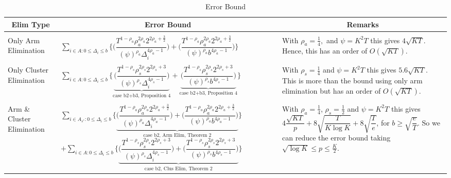 \begin{remark}
\begin{table}
\begin{center}
\begin{tabular}{p{1.4cm}p{10.2cm}p{3.5cm}}
\end{tabular}
\end{center}
\end{table}

\begin{table}
\caption{Error Bound}
\label{App:E:table:3}
\begin{center}
\begin{tabular}{p{1.4cm}p{10.2cm}p{3.5cm}}
\multicolumn{1}{c}{\bf Elim Type} &\multicolumn{1}{c}{\bf Error Bound} &\multicolumn{1}{c}{\bf Remarks} \\
\hline \\
Only Arm Elimination	&$\sum_{i\in A:0\leq\Delta_{i}\leq b}\bigg\lbrace\bigg(\dfrac{T^{1-\rho_{a}}\rho_{a}^{2\rho_{a}}2^{2\rho_{a}+\frac{3}{2}}}{(\psi)^{\rho_{a}}\Delta_{i}^{4\rho_{a} -1}} \bigg) + \bigg( \dfrac{T^{1-\rho_{a}}\rho_{a}^{2\rho_{a}}2^{2\rho_{a}+\frac{3}{2}}}{(\psi)^{\rho_{a}}b^{4\rho_{a} -1}} \bigg)\bigg\rbrace$ & With $\rho_{a}=\frac{1}{4},$ and $\psi=K^{2}T$ this gives $4\sqrt{KT}$. Hence, this has an order of $O(\sqrt{KT})$.\\
\hline\\
Only Cluster Elimination	&$\sum_{i\in A:0\leq\Delta_{i}\leq b}\bigg\lbrace\underbrace{\bigg(\dfrac{T^{1-\rho_{s}}\rho_{s}^{2\rho_{s}}2^{2\rho_{s}+3}}{(\psi)^{\rho_{s}}\Delta_{i}^{4\rho_{s} -1}} \bigg)}_{\text{case b2+b3, Proposition 4}} +\underbrace{\bigg(\dfrac{T^{1-\rho_{s}}\rho_{s}^{2\rho_{s}}2^{2\rho_{s}+3}}{(\psi)^{\rho_{s}}b^{4\rho_{s} -1}} \bigg)}_{\text{case b2+b3, Proposition 4}}\bigg\rbrace$ & With $\rho_{s}=\frac{1}{4}$ and $\psi=K^{2}T$ this gives $5.6\sqrt{KT}$. This is more than the bound using only arm elimination but has an order of $O(\sqrt{KT})$.\\
\hline\\
Arm \& Cluster Elimination 	&$\sum_{i\in A_{s^{*}}:0\leq\Delta_{i}\leq b}\bigg\lbrace \underbrace{\bigg(\dfrac{T^{1-\rho_{a}}\rho_{a}^{2\rho_{a}}2^{2\rho_{a}+\frac{3}{2}}}{(\psi)^{\rho_{a}}\Delta_{i}^{4\rho_{a}-1}} \bigg)+\bigg(\dfrac{T^{1-\rho_{a}}\rho_{a}^{2\rho_{a}}2^{2\rho_{a}+\frac{3}{2}}}{(\psi)^{\rho_{a}}b^{4\rho_{a} -1}} \bigg)}_{\text{case b2, Arm Elim, Theorem 2}}\bigg\rbrace $ $+ \sum_{i\in A:0\leq\Delta_{i}\leq b}\bigg\lbrace\underbrace{\bigg(\dfrac{T^{1-\rho_{s}}\rho_{s}^{2\rho_{s}}2^{2\rho_{s}+3}}{(\psi)^{\rho_{s}}\Delta_{i}^{4\rho_{s}-1}} \bigg)+\bigg(\dfrac{T^{1-\rho_{s}}\rho_{s}^{2\rho_{s}}2^{2\rho_{s}+3}}{(\psi)^{\rho_{s}}b^{4\rho_{s} -1}} \bigg)}_{\text{case b2, Clus Elim, Theorem 2}} \bigg\rbrace$ & With $\rho_{a}=\frac{1}{4}$, $\rho_{s}=\frac{1}{2}$ and $\psi=K^{2}T$ this gives $4\dfrac{\sqrt{KT}}{p} + 8\sqrt{\dfrac{T}{K\log K}} + 8\sqrt{\dfrac{T}{e}}$, for $b\geq \sqrt{\dfrac{e}{T}}$. So we can reduce the error bound taking $\sqrt{\log K}\leq p\leq \frac{K}{2}$. 

\end{tabular}
\end{center}
\end{table}
\end{remark}

